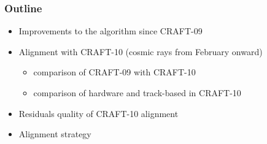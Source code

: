 \documentclass[compress]{beamer}
\begin{document}
\begin{frame}
\frametitle{Outline}
\begin{itemize}\setlength{\itemsep}{0.75 cm}
\item Improvements to the algorithm since CRAFT-09

\item Alignment with CRAFT-10 (cosmic rays from February onward)

\vspace{0.1 cm}
\begin{itemize}\setlength{\itemsep}{0.25 cm}
\item comparison of CRAFT-09 with CRAFT-10

\item comparison of hardware and track-based in CRAFT-10
\end{itemize}

\item Residuals quality of CRAFT-10 alignment

\item Alignment strategy
\end{itemize}
\end{frame}
\end{document}
